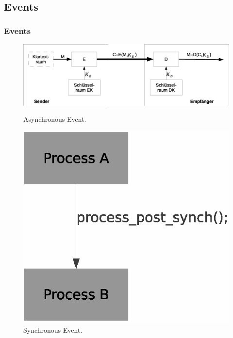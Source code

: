 \documentclass{beamer}
\begin{document}
\subsection*{Events}
\begin{frame}
\frametitle{Events}
\begin{figure}[!tbp]
  \centering
  \begin{minipage}[b]{0.4\textwidth}
    \includegraphics[width=\textwidth]{async.eps}
    \caption{Asynchronous Event.}
  \end{minipage}
  \hfill
  \begin{minipage}[b]{0.4\textwidth}
    \includegraphics[width=\textwidth]{sync.eps}
    \caption{Synchronous Event.}
  \end{minipage}
\end{figure}
\end{frame}
\end{document}
